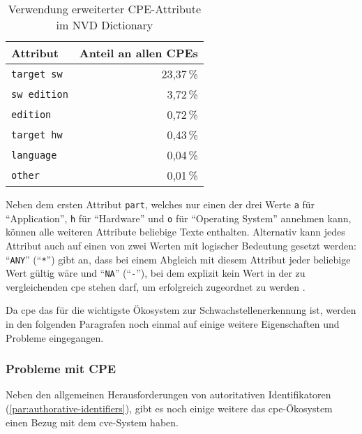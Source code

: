 \begin{table}[h]
    \centering
    \begin{tabular}{lr}
        \toprule
        \textbf{Attribut}   & \textbf{Anteil an allen CPEs} \\
        \midrule
        \texttt{target sw}  & 23{,}37\,\%                   \\
        \texttt{sw edition} & 3{,}72\,\%                    \\
        \texttt{edition}    & 0{,}72\,\%                    \\
        \texttt{target hw}  & 0{,}43\,\%                    \\
        \texttt{language}   & 0{,}04\,\%                    \\
        \texttt{other}      & 0{,}01\,\%                    \\
        \bottomrule
    \end{tabular}
    \caption{Verwendung erweiterter CPE-Attribute im NVD Dictionary}
    \label{tab:cpe-attribute-verteilung}
\end{table}

Neben dem ersten Attribut \texttt{part}, welches nur einen der drei Werte \texttt{a} für \enquote{Application}, \texttt{h} für \enquote{Hardware} und \texttt{o} für \enquote{Operating System} annehmen kann, können alle weiteren Attribute beliebige Texte enthalten.
Alternativ kann jedes Attribut auch auf einen von zwei Werten mit logischer Bedeutung gesetzt werden:
\enquote{\texttt{ANY}} (\enquote{\texttt{*}}) gibt an, dass bei einem Abgleich mit diesem Attribut jeder beliebige Wert gültig wäre und \enquote{\texttt{NA}} (\enquote{\texttt{-}}), bei dem explizit kein Wert in der zu vergleichenden \acrshort{cpe} stehen darf, um erfolgreich zugeordnet zu werden \autocite{Parmelee_Booth_Waltermire_Scarfone_2011}.

Da \acrshort{cpe} das für die \metaeffektsp wichtigste Ökosystem zur Schwachstellenerkennung ist, werden in den folgenden Paragrafen noch einmal auf einige weitere Eigenschaften und Probleme eingegangen.

\subsubsection{Probleme mit CPE}

Neben den allgemeinen Herausforderungen von autoritativen Identifikatoren (\autoref{par:authorative-identifiers}), gibt es noch einige weitere das \acrshort{cpe}-Ökosystem einen Bezug mit dem \acrshort{cve}-System haben.

